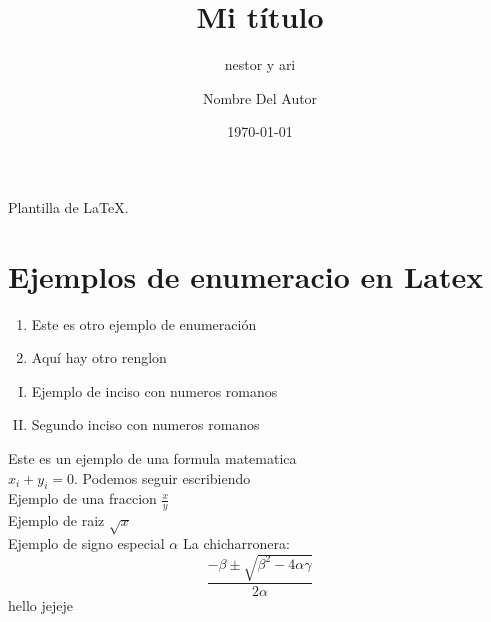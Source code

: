 \documentclass{article}
\author{Nombre Del Autor}
\title{Mi título}
\date{\today}
\begin{document}
\maketitle

Plantilla de \LaTeX.

\section{Ejemplos de enumeracio en Latex}
\subtitle{nestor y ari}
  
    

  
    \begin{enumerate}
      
      
      
\item Este es otro ejemplo de enumeración
\item Aquí hay otro renglon
    \end{enumerate}
    

    \begin{enumerate}[I.]
    \item Ejemplo de inciso con numeros romanos
    \item Segundo inciso con numeros romanos
    \end{enumerate}

  
    Este es un ejemplo de una formula matematica \\
    $x_i + y_i=0$. Podemos seguir escribiendo\\
    Ejemplo de una fraccion $\frac{x}{y}$\\
    Ejemplo de raiz $\sqrt{x}$\\
    Ejemplo de signo especial $\alpha$
    La chicharronera:\\
    $$\frac{-\beta\pm\sqrt{\beta^2-4\alpha\gamma}}{2\alpha}$$
    \newline
    hello jejeje
\end{document}
